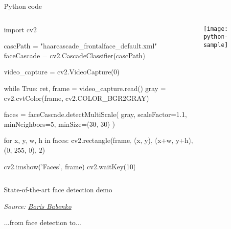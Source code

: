 \documentclass[compress]{beamer}
\newcommand{\source}[2]{{\tiny\it Source: \href{#1}{#2}}}
\begin{document}
\begin{frame}[fragile]{Python code}

    \begin{columns}
        \begin{column}{0.7\linewidth}
            \begin{pythoncode}
import cv2

cascPath = "haarcascade_frontalface_default.xml"
faceCascade = cv2.CascadeClassifier(cascPath)

video_capture = cv2.VideoCapture(0)

while True:
    ret, frame = video_capture.read()
    gray = cv2.cvtColor(frame, cv2.COLOR_BGR2GRAY)

    faces = faceCascade.detectMultiScale(
        gray,
        scaleFactor=1.1,
        minNeighbors=5,
        minSize=(30, 30)
    )

    for x, y, w, h in faces:
        cv2.rectangle(frame, (x, y), (x+w, y+h), (0, 255, 0), 2)

    cv2.imshow('Faces', frame)
    cv2.waitKey(10)
            \end{pythoncode}

        \end{column}
        \begin{column}{0.3\linewidth}
            \begin{center}
                \texttt{[image: python-sample]}
            \end{center}
        \end{column}
    \end{columns}
\end{frame}

\begin{frame}{State-of-the-art face detection demo}

    \begin{center}

        \source{http://vision.ucsd.edu/~bbabenko/}{Boris Babenko}
    \end{center}

\end{frame}



\begin{frame}[plain]
    \begin{center}
        ...from face detection to...
    \end{center}
\end{frame}
\end{document}
